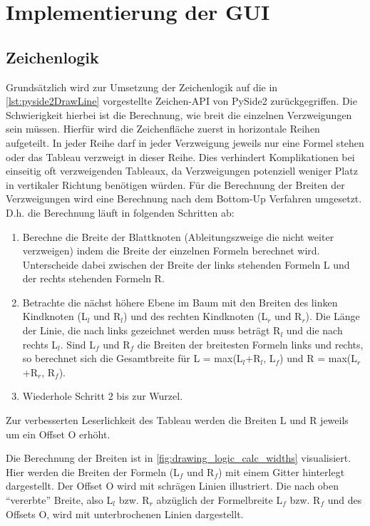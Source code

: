 \section{Implementierung der \ac{GUI}\label{sec:ui_impl}}
\subsection{Zeichenlogik}
Grundsätzlich wird zur Umsetzung der Zeichenlogik auf die in \autoref{lst:pyside2DrawLine} vorgestellte Zeichen-API von PySide2 zurückgegriffen. Die Schwierigkeit hierbei ist die Berechnung, wie breit die einzelnen Verzweigungen sein müssen. Hierfür wird die Zeichenfläche zuerst in horizontale Reihen aufgeteilt. In jeder Reihe darf in jeder Verzweigung jeweils nur eine Formel stehen oder das Tableau verzweigt in dieser Reihe. Dies verhindert Komplikationen bei einseitig oft verzweigenden Tableaux, da Verzweigungen potenziell weniger Platz in vertikaler Richtung benötigen würden. Für die Berechnung der Breiten der Verzweigungen wird eine Berechnung nach dem Bottom-Up Verfahren umgesetzt. D.h. die Berechnung läuft in folgenden Schritten ab:
\begin{enumerate}
\item Berechne die Breite der Blattknoten (Ableitungszweige die nicht weiter verzweigen) indem die Breite der einzelnen Formeln berechnet wird. Unterscheide dabei zwischen der Breite der links stehenden Formeln L und der rechts stehenden Formeln R.

\item Betrachte die nächst höhere Ebene im Baum mit den Breiten des linken Kindknoten (L$_{l}$ und R$_{l}$) und des rechten Kindknoten (L$_{r}$ und R$_{r}$). Die Länge der Linie, die nach links gezeichnet werden muss beträgt R$_{l}$ und die nach rechts L$_{l}$. Sind L$_{f}$ und R$_{f}$ die Breiten der breitesten Formeln links und rechts, so berechnet sich die Gesamtbreite für L = max(L$_{l}$+R$_{l}$, L$_{f}$) und R = max(L$_{r}$+R$_{r}$, R$_{f}$).

\item Wiederhole Schritt 2 bis zur Wurzel.
\end{enumerate}

Zur verbesserten Leserlichkeit des Tableau werden die Breiten L und R jeweils um ein Offset O erhöht.

Die Berechnung der Breiten ist in \autoref{fig:drawing_logic_calc_widths} visualisiert. Hier werden die Breiten der Formeln (L$_{f}$ und R$_{f}$) mit einem Gitter hinterlegt dargestellt. Der Offset O wird mit schrägen Linien illustriert. Die nach oben ``vererbte'' Breite, also L$_{l}$ bzw. R$_{r}$ abzüglich der Formelbreite L$_{f}$ bzw. R$_{f}$ und des Offsets O, wird mit unterbrochenen Linien dargestellt.

